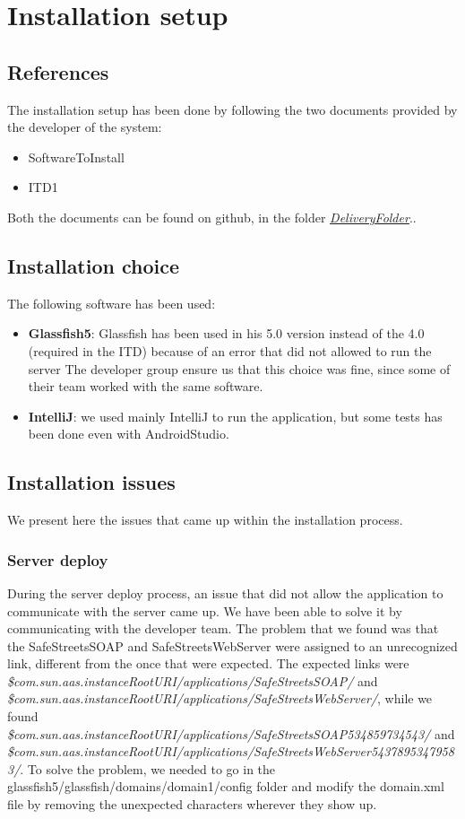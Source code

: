 \documentclass[../ATD.tex]{subfiles}
\begin{document}
    \chapter{Installation setup}\label{ch:installation-setup}
    \section{References}\label{sec:references}
    The installation setup has been done by following the two documents provided by the developer of the system:
    \begin{itemize}
        \item SoftwareToInstall
        \item ITD1
    \end{itemize}
    Both the documents can be found on github, in the folder \href{https://github.com/gianfi12/AbboAccordiBonetti/DeliveryFolder}{\emph{DeliveryFolder}}..

    \section{Installation choice}\label{sec:installation-choice}
    The following software has been used:
    \begin{itemize}
        \item \textbf{Glassfish5}: Glassfish has been used in his 5.0 version instead of the 4.0 (required in the ITD) because of an error that did not allowed to run the server
        The developer group ensure us that this choice was fine, since some of their team worked with the same software.
        \item \textbf{IntelliJ}: we used mainly IntelliJ to run the application, but some tests has been done even with AndroidStudio.
    \end{itemize}

    \section{Installation issues}\label{sec:installation-issues}
    We present here the issues that came up within the installation process.
    \subsection{Server deploy}\label{subsec:server-deploy}
    During the server deploy process, an issue that did not allow the application to communicate with the server came up.
    We have been able to solve it by communicating with the developer team.
    The problem that we found was that the SafeStreetsSOAP and SafeStreetsWebServer were assigned to an unrecognized link, different from the once that were expected.
    The expected links were \textit{\${com.sun.aas.instanceRootURI}/applications/SafeStreetsSOAP/} and \textit{\${com.sun.aas.instanceRootURI}/applications/SafeStreetsWebServer/},
    while we found \textit{\${com.sun.aas.instanceRootURI}/applications/SafeStreetsSOAP534859734543/} and \textit{\${com.sun.aas.instanceRootURI}/applications/SafeStreetsWebServer54378953479583/}.
    To solve the problem, we needed to go in the glassfish5/glassfish/domains/domain1/config folder and modify the domain.xml file by removing the unexpected characters wherever they show up.
\end{document}
